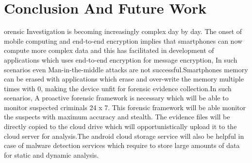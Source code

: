 %
%
\let\textcircled=\pgftextcircled
\chapter{Conclusion And Future Work}
\label{chap:Conclusion And Future Work}
orensic Investigation is becoming increasingly complex day by day. The onset of mobile computing and end-to-end encryption implies that smartphones can now compute more complex data and this has facilitated in development of applications which uses end-to-end encryption for message encryption, In such scenarios even Man-in-the-middle attacks are not successful.Smartphones memory  can be erased with 
applications which erase and over-write the memory multiple times with 0, making the device unfit for forensic evidence collection.In such scenarios, A proactive forensic framework is necessary which will be able to monitor suspected criminals 24 x 7. This forensic framework will be able monitor the suspects with maximum accuracy and stealth. The evidence files will be directly copied to the cloud drive which will opportunistically upload it to the cloud server for analysis.The android cloud storage service will also be helpful in case of malware detection services which require to store large amounts of data for static and dynamic analysis.

